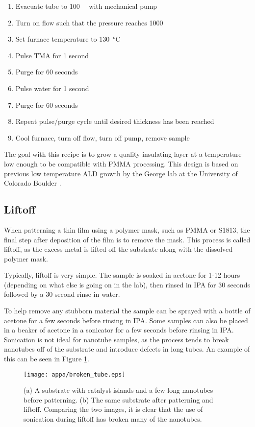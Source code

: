 \begin{enumerate}
\item Evacuate tube to \SI{100}{\milli\torr} with mechanical pump
\item Turn on  flow such that the pressure reaches \SI{1000}{\milli\torr}
\item Set furnace temperature to \SI{130}{\degreeCelsius}
\item Pulse TMA for 1 second
\item Purge for 60 seconds
\item Pulse water for 1 second
\item Purge for 60 seconds
\item Repeat pulse\slash purge cycle until desired thickness has been reached
\item Cool furnace, turn off  flow, turn off pump, remove sample
\end{enumerate}

The goal with this recipe is to grow a quality insulating layer at a temperature low enough to be compatible with PMMA processing. This design is based on previous low temperature ALD growth by the George lab at the University of Colorado Boulder \cite{Elam2002, Groner2004}.

\subsection{Liftoff}
\label{subsec:liftoff}

When patterning a thin film using a polymer mask, such as PMMA or S1813, the final step after deposition of the film is to remove the mask. This process is called liftoff, as the excess metal is lifted off the substrate along with the dissolved polymer mask.

Typically, liftoff is very simple. The sample is soaked in acetone for 1-12 hours (depending on what else is going on in the lab), then rinsed in IPA for 30 seconds followed by a 30 second rinse in water. 

To help remove any stubborn material the sample can be sprayed with a bottle of acetone for a few seconds before rinsing in IPA. Some samples can also be placed in a beaker of acetone in a sonicator for a few seconds before rinsing in IPA. Sonication is not ideal for nanotube samples, as the process tends to break nanotubes off of the substrate and introduce defects in long tubes. An example of this can be seen in Figure \ref{fig:broken_tube}.

\begin{figure}
	\centering
	\texttt{[image: appa/broken\_tube.eps]}
	\caption{(a) A substrate with catalyst islands and a few long nanotubes before patterning. (b) The same substrate after patterning and liftoff. Comparing the two images, it is clear that the use of sonication during liftoff has broken many of the nanotubes.}
	\label{fig:broken_tube}
\end{figure}

